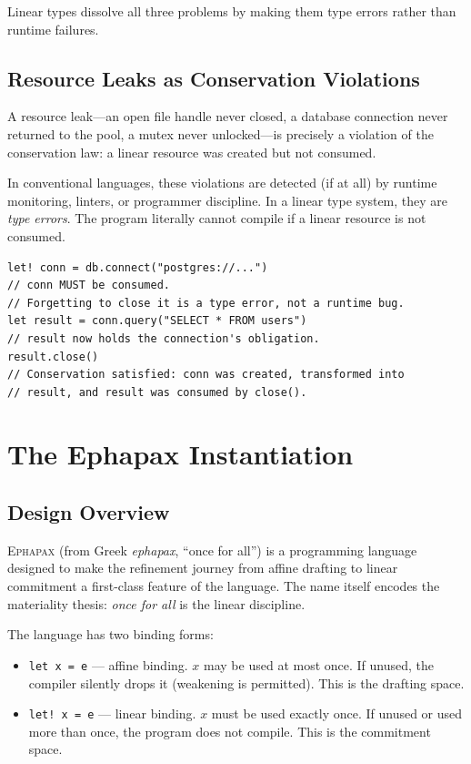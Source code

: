 \documentclass[11pt,a4paper]{article}
\newcommand{\ephapax}{\textsc{Ephapax}}
\begin{document}
Linear types dissolve all three problems by making them
type errors rather than runtime failures.

\subsection{Resource Leaks as Conservation Violations}

A resource leak---an open file handle never closed, a database
connection never returned to the pool, a mutex never unlocked---is
precisely a violation of the conservation law: a linear resource
was created but not consumed.

In conventional languages, these violations are detected (if at all)
by runtime monitoring, linters, or programmer discipline. In a
linear type system, they are \emph{type errors}. The program
literally cannot compile if a linear resource is not consumed.

\begin{lstlisting}
let! conn = db.connect("postgres://...")
// conn MUST be consumed.
// Forgetting to close it is a type error, not a runtime bug.
let result = conn.query("SELECT * FROM users")
// result now holds the connection's obligation.
result.close()
// Conservation satisfied: conn was created, transformed into
// result, and result was consumed by close().
\end{lstlisting}


\section{The Ephapax Instantiation}
\label{sec:ephapax}

\subsection{Design Overview}

\ephapax{} (from Greek \emph{ephapax}, ``once for all'') is a
programming language designed to make the refinement journey from
affine drafting to linear commitment a first-class feature of the
language. The name itself encodes the materiality thesis: \emph{once
for all} is the linear discipline.

The language has two binding forms:

\begin{itemize}
\item \texttt{let x = e} --- affine binding. $x$ may be used at most
  once. If unused, the compiler silently drops it (weakening is
  permitted). This is the drafting space.
\item \texttt{let! x = e} --- linear binding. $x$ must be used
  exactly once. If unused or used more than once, the program does
  not compile. This is the commitment space.
\end{itemize}
\end{document}
